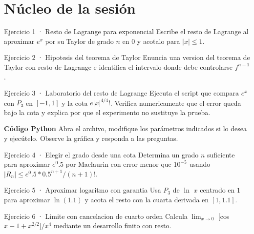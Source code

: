\documentclass[10pt,a4paper,oneside,openany]{book}
\begin{document}
\section*{Núcleo de la sesión}
\begin{PSevenExerciseFixed}{Ejercicio 1 · Resto de Lagrange para exponencial}
Escribe el resto de Lagrange al aproximar \(e^x\) por su Taylor de grado \(n\) en \(0\) y acotalo para \(|x|\le 1\).
\end{PSevenExerciseFixed}
\begin{PSevenExerciseFixed}{Ejercicio 2 · Hipotesis del teorema de Taylor}
Enuncia una version del teorema de Taylor con resto de Lagrange e identifica el intervalo donde debe controlarse \(f^{n+1}\).
\end{PSevenExerciseFixed}
\begin{PSevenExercise}{Ejercicio 3 · Laboratorio del resto de Lagrange}
Ejecuta el script que compara \(e^x\) con \(P_3\) en \([-1,1]\) y la cota \(e|x|^{4/4}!\). Verifica numericamente que el error queda bajo la cota y explica por que el experimento no sustituye la prueba.
\par\medskip\textbf{Código Python}
Abra el archivo, modifique los parámetros indicados si lo desea y
ejecútelo. Observe la gráfica y responda a las preguntas.\par\smallskip
{}
\end{PSevenExercise}
\begin{PSevenExerciseFixed}{Ejercicio 4 · Elegir el grado desde una cota}
Determina un grado \(n\) suficiente para aproximar \(e^{0}.5\) por Maclaurin con error menor que \(10^{-5}\) usando \(|R_n|\le e^{0}.5*0.5^{n+1}/(n+1)!\).
\end{PSevenExerciseFixed}
\begin{PSevenExerciseFixed}{Ejercicio 5 · Aproximar logaritmo con garantia}
Usa \(P_3\) de \(\ln\) \(x\) centrado en \(1\) para aproximar \(\ln(1.1)\) y acota el resto con la cuarta derivada en \([1,1.1]\).
\end{PSevenExerciseFixed}
\begin{PSevenExerciseFixed}{Ejercicio 6 · Limite con cancelacion de cuarto orden}
Calcula \(\lim_{x\to 0}\) [cos \(x-1+x^{2/2}]/x^{4}\) mediante un desarrollo finito con resto.
\end{PSevenExerciseFixed}
\end{document}
